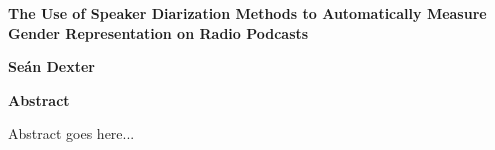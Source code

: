 \thispagestyle{plain}
\begin{center}
    \Large
    \textbf{The Use of Speaker Diarization Methods to Automatically Measure Gender Representation on Radio Podcasts}
    
    \vspace{0.4cm}
    \large
    
    \vspace{0.4cm}
    \textbf{Se\'{a}n Dexter}
    
    \vspace{0.9cm}
    \textbf{Abstract}
\end{center}
Abstract goes here...